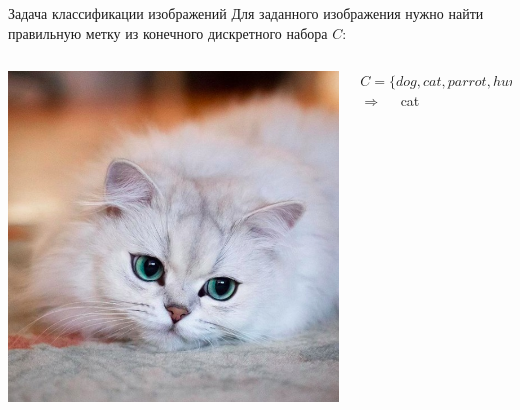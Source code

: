 \documentclass[aspectratio=169, professionalfonts]{beamer}
\begin{document}
\begin{frame}{Задача классификации изображений}
    Для заданного изображения нужно найти правильную метку
    из конечного дискретного набора \( C \):
    \vfill
    \begin{columns}
        \begin{column}{.35\linewidth}
            \includegraphics[width=\linewidth]{figures/fig7-cat.jpg}
        \end{column}
        \begin{column}{.65\linewidth}
            \( C = \{dog, cat, parrot, human, car, ninja, \ldots \} \) \\
            \hfill
            \vfill
            \( \Longrightarrow \quad \) cat
        \end{column}
    \end{columns}
\end{frame}
\end{document}
